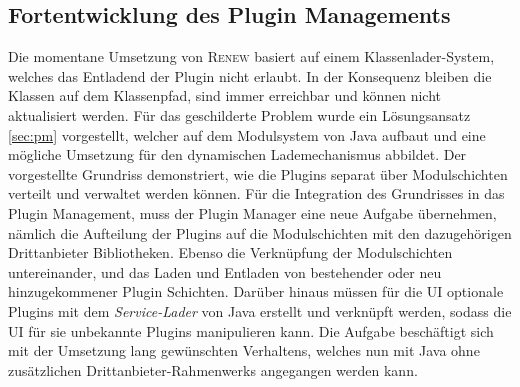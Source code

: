  \subsection*{Fortentwicklung des Plugin Managements}
	Die momentane Umsetzung von \textsc{Renew} basiert auf einem Klassenlader-System, welches das Entladend der Plugin nicht erlaubt. In der Konsequenz bleiben die Klassen auf dem Klassenpfad, sind immer erreichbar und können nicht aktualisiert werden. Für das geschilderte Problem wurde ein Lösungsansatz \ref{sec:pm} vorgestellt, welcher auf dem Modulsystem von Java aufbaut und eine mögliche Umsetzung für den dynamischen Lademechanismus abbildet. Der vorgestellte Grundriss demonstriert, wie die Plugins separat über Modulschichten verteilt und verwaltet werden können.\newline
	Für die Integration des Grundrisses in das Plugin Management, muss der Plugin Manager eine neue Aufgabe übernehmen, nämlich die Aufteilung der Plugins auf die Modulschichten mit den dazugehörigen Drittanbieter Bibliotheken. Ebenso die Verknüpfung der Modulschichten untereinander, und das Laden und Entladen von bestehender oder neu hinzugekommener Plugin Schichten. Darüber hinaus müssen für die UI optionale Plugins mit dem \textit{Service-Lader} von Java erstellt und verknüpft werden, sodass die UI für sie unbekannte Plugins manipulieren kann. \newline
	Die Aufgabe beschäftigt sich mit der Umsetzung lang gewünschten Verhaltens, welches nun mit Java ohne zusätzlichen Drittanbieter-Rahmenwerks angegangen werden kann. 




